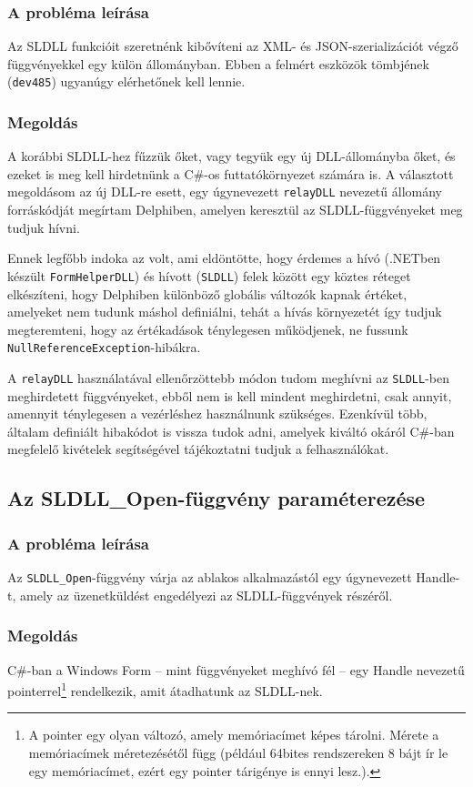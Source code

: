 \documentclass[tocnopagenum]{thesis-ekf}
\begin{document}
	\subsubsection{A probléma leírása} Az SLDLL funkcióit szeretnénk kibővíteni az XML- és JSON-szerializációt végző függvényekkel egy külön állományban. Ebben a felmért eszközök tömbjének (\verb*|dev485|) ugyanúgy elérhetőnek kell lennie.
	\subsubsection{Megoldás} A korábbi SLDLL-hez fűzzük őket, vagy tegyük egy új DLL-állományba őket, és ezeket is meg kell hirdetnünk a C\#-os futtatókörnyezet számára is. A választott megoldásom az új DLL-re esett, egy úgynevezett \verb*|relayDLL| nevezetű állomány forráskódját megírtam Delphiben, amelyen keresztül az SLDLL-függvényeket meg tudjuk hívni.
	
	Ennek legfőbb indoka az volt, ami eldöntötte, hogy érdemes a hívó (.NETben készült \verb*|FormHelperDLL|) és hívott (\verb*|SLDLL|) felek között egy köztes réteget elkészíteni, hogy Delphiben különböző globális változók kapnak értéket, amelyeket nem tudunk máshol definiálni, tehát a hívás környezetét így tudjuk megteremteni, hogy az értékadások ténylegesen működjenek, ne fussunk \verb*|NullReferenceException|-hibákra.
	
	A \verb*|relayDLL| használatával ellenőrzöttebb módon tudom meghívni az \verb*|SLDLL|-ben meghirdetett függvényeket, ebből nem is kell mindent meghirdetni, csak annyit, amennyit ténylegesen a vezérléshez használnunk szükséges. Ezenkívül több, általam definiált hibakódot is vissza tudok adni, amelyek kiváltó okáról C\#-ban megfelelő kivételek segítségével tájékoztatni tudjuk a felhasználókat.
	\subsection{Az SLDLL\_Open-függvény paraméterezése}
	\subsubsection{A probléma leírása} Az \verb*|SLDLL_Open|-függvény várja az ablakos alkalmazástól egy úgynevezett Handle-t, amely az üzenetküldést engedélyezi az SLDLL-függvények részéről.
	\subsubsection{Megoldás} C\#-ban a Windows Form -- mint függvényeket meghívó fél -- egy Handle nevezetű pointerrel\footnote{A pointer egy olyan változó, amely memóriacímet képes tárolni. Mérete a memóriacímek méretezésétől függ (például 64bites rendszereken 8 bájt ír le egy memóriacímet, ezért egy pointer tárigénye is ennyi lesz.).} rendelkezik, amit átadhatunk az SLDLL-nek.
\end{document}
